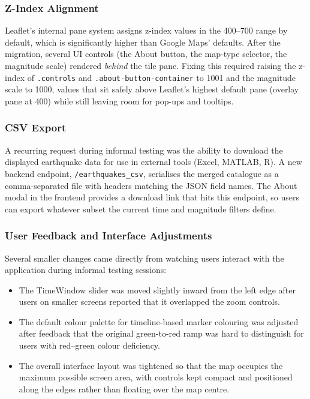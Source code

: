 \documentclass[12pt]{article}
\begin{document}
\subsubsection{Z-Index Alignment}

Leaflet's internal pane system assigns z-index values in the 400--700 range by default, which is significantly higher than Google Maps' defaults. After the migration, several UI controls (the About button, the map-type selector, the magnitude scale) rendered \emph{behind} the tile pane. Fixing this required raising the z-index of \texttt{.controls} and \texttt{.about-button-container} to 1001 and the magnitude scale to 1000, values that sit safely above Leaflet's highest default pane (overlay pane at 400) while still leaving room for pop-ups and tooltips.

\subsubsection{CSV Export}

A recurring request during informal testing was the ability to download the displayed earthquake data for use in external tools (Excel, MATLAB, R). A new backend endpoint, \texttt{/earthquakes\_csv}, serialises the merged catalogue as a comma-separated file with headers matching the JSON field names. The About modal in the frontend provides a download link that hits this endpoint, so users can export whatever subset the current time and magnitude filters define.

\subsubsection{User Feedback and Interface Adjustments}

Several smaller changes came directly from watching users interact with the application during informal testing sessions:

\begin{itemize}
    \item The TimeWindow slider was moved slightly inward from the left edge after users on smaller screens reported that it overlapped the zoom controls.
    \item The default colour palette for timeline-based marker colouring was adjusted after feedback that the original green-to-red ramp was hard to distinguish for users with red--green colour deficiency.
    \item The overall interface layout was tightened so that the map occupies the maximum possible screen area, with controls kept compact and positioned along the edges rather than floating over the map centre.
\end{itemize}
\end{document}
